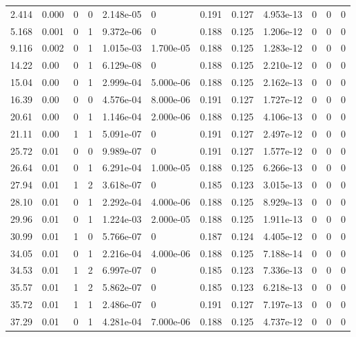 \documentclass[preview]{standalone}
\begin{document}
{{\begin{tabular}{L{1.2cm}C{1.2cm} C{0.3cm}C{0.5cm} C{1.4cm}C{1.4cm} C{1.4cm}C{1.4cm} C{1.6cm}C{1.6cm} C{1.6cm}C{1.6cm}}
  2.414  &  0.000  & 0     &  0 &  2.148e-05  & 0  &  0.191&   0.127& 4.953e-13 & 0   &  0 & 0  \\ 
  5.168  &  0.001  & 0     &  1 &  9.372e-06  & 0  &  0.188&   0.125& 1.206e-12 & 0   &  0 & 0  \\ 
  9.116  &  0.002  & 0     &  1 &  1.015e-03  & 1.700e-05  &  0.188&   0.125& 1.283e-12 & 0   &  0 & 0  \\ 
  14.22  &  0.00  & 0     &  1 &  6.129e-08  & 0  &  0.188&   0.125& 2.210e-12 & 0   &  0 & 0  \\ 
  15.04  &  0.00  & 0     &  1 &  2.999e-04  & 5.000e-06  &  0.188&   0.125& 2.162e-13 & 0   &  0 & 0  \\ 
  16.39  &  0.00  & 0     &  0 &  4.576e-04  & 8.000e-06  &  0.191&   0.127& 1.727e-12 & 0   &  0 & 0  \\ 
  20.61  &  0.00  & 0     &  1 &  1.146e-04  & 2.000e-06  &  0.188&   0.125& 4.106e-13 & 0   &  0 & 0  \\ 
  21.11  &  0.00  & 1     &  1 &  5.091e-07  & 0  &  0.191&   0.127& 2.497e-12 & 0   &  0 & 0  \\ 
  25.72  &  0.01  & 0     &  0 &  9.989e-07  & 0  &  0.191&   0.127& 1.577e-12 & 0   &  0 & 0  \\ 
  26.64  &  0.01  & 0     &  1 &  6.291e-04  & 1.000e-05  &  0.188&   0.125& 6.266e-13 & 0   &  0 & 0  \\ 
  27.94  &  0.01  & 1     &  2 &  3.618e-07  & 0  &  0.185&   0.123& 3.015e-13 & 0   &  0 & 0  \\ 
  28.10  &  0.01  & 0     &  1 &  2.292e-04  & 4.000e-06  &  0.188&   0.125& 8.929e-13 & 0   &  0 & 0  \\ 
  29.96  &  0.01  & 0     &  1 &  1.224e-03  & 2.000e-05  &  0.188&   0.125& 1.911e-13 & 0   &  0 & 0  \\ 
  30.99  &  0.01  & 1     &  0 &  5.766e-07  & 0  &  0.187&   0.124& 4.405e-12 & 0   &  0 & 0  \\ 
  34.05  &  0.01  & 0     &  1 &  2.216e-04  & 4.000e-06  &  0.188&   0.125& 7.188e-14 & 0   &  0 & 0  \\ 
  34.53  &  0.01  & 1     &  2 &  6.997e-07  & 0  &  0.185&   0.123& 7.336e-13 & 0   &  0 & 0  \\ 
  35.57  &  0.01  & 1     &  2 &  5.862e-07  & 0  &  0.185&   0.123& 6.218e-13 & 0   &  0 & 0  \\ 
  35.72  &  0.01  & 1     &  1 &  2.486e-07  & 0  &  0.191&   0.127& 7.197e-13 & 0   &  0 & 0  \\ 
  37.29  &  0.01  & 0     &  1 &  4.281e-04  & 7.000e-06  &  0.188&   0.125& 4.737e-12 & 0   &  0 & 0  \\ 

\end{tabular}}}
\end{document}
